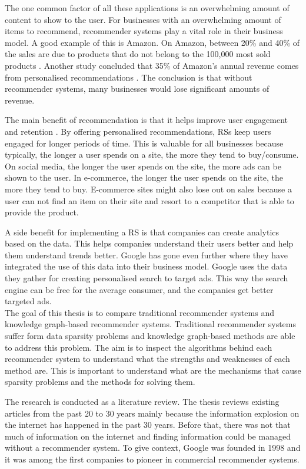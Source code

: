 \documentclass[english, 12pt, a4paper, sci, utf8, a-2b, online]{aaltothesis}
\begin{document}
The one common factor of all these applications is an overwhelming amount of content to show to the user. For businesses with an overwhelming amount of items to recommend, recommender systems play a vital role in their business model. A good example of this is Amazon. On Amazon, between 20\% and 40\% of the sales are due to products that do not belong to the 100,000 most sold products \parencite{doi:10.1287/mnsc.49.11.1580.20580}. Another study concluded that 35\% of Amazon's annual revenue comes from personalised recommendations \parencite{lee2014impact}. The conclusion is that without recommender systems, many businesses would lose significant amounts of revenue.

The main benefit of recommendation is that it helps improve user engagement and retention \parencite{jetti2025knowledge}. By offering personalised recommendations, RSs keep users engaged for longer periods of time. This is valuable for all businesses because typically, the longer a user spends on a site, the more they tend to buy/consume. On social media, the longer the user spends on the site, the more ads can be shown to the user. In e-commerce, the longer the user spends on the site, the more they tend to buy. E-commerce sites might also lose out on sales because a user can not find an item on their site and resort to a competitor that is able to provide the product.

A side benefit for implementing a RS is that companies can create analytics based on the data. This helps companies understand their users better and help them understand trends better. Google has gone even further where they have integrated the use of this data into their business model. Google uses the data they gather for creating personalised search to target ads. This way the search engine can be free for the average consumer, and the companies get better targeted ads. \\

The goal of this thesis is to compare traditional recommender systems and knowledge graph-based recommender systems. Traditional recommender systems suffer form data sparsity problems and knowledge graph-based methods are able to address this problem. The aim is to inspect the algorithms behind each recommender system to understand what the strengths and weaknesses of each method are. This is important to understand what are the mechanisms that cause sparsity problems and the methods for solving them.

The research is conducted as a literature review. The thesis reviews existing articles from the past 20 to 30 years mainly because the information explosion on the internet has happened in the past 30 years. Before that, there was not that much of information on the internet and finding information could be managed without a recommender system. To give context, Google was founded in 1998 and it was among the first companies to pioneer in commercial recommender systems. 
\end{document}
